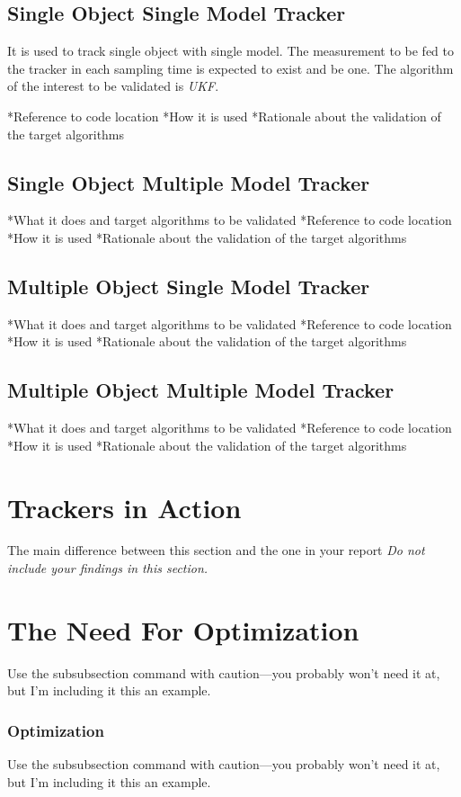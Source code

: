 \documentclass[peerreview]{IEEEtran}
\begin{document}
\subsection{Single Object Single Model Tracker}

It is used to track single object with single model. The measurement to be fed to the tracker in each sampling time is expected to exist and be one. The algorithm of the interest to be validated is \emph{UKF}.

*Reference to code location
*How it is used
*Rationale about the validation of the target algorithms

\subsection{Single Object Multiple Model Tracker}
*What it does and target algorithms to be validated
*Reference to code location
*How it is used
*Rationale about the validation of the target algorithms
\subsection{Multiple Object Single Model Tracker}
*What it does and target algorithms to be validated
*Reference to code location
*How it is used
*Rationale about the validation of the target algorithms
\subsection{Multiple Object Multiple Model Tracker}
*What it does and target algorithms to be validated
*Reference to code location
*How it is used
*Rationale about the validation of the target algorithms

\section{Trackers in Action}
The main difference between this section and the one in your report 
\emph{Do not include your findings in this section.}

\section{The Need For Optimization}
Use the subsubsection command with caution---you probably won't need it at, but I'm including it this an example.


\subsubsection{Optimization}
Use the subsubsection command with caution---you probably won't need it at, but I'm including it this an example.
\end{document}
